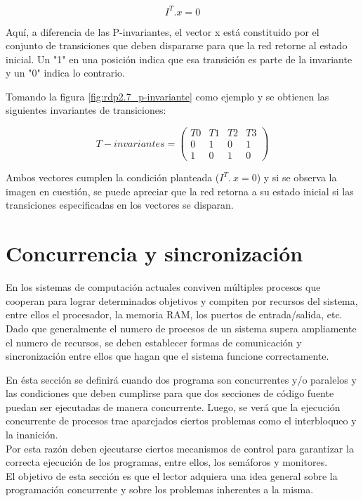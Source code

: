 \begin{equation}
    I^T . x = 0
\end{equation}

Aquí, a diferencia de las P-invariantes, el vector x está constituido por el conjunto de transiciones que deben dispararse para que la red retorne al estado inicial. Un "1" en una posición indica que esa transición es parte de la invariante y un "0" indica lo contrario.

Tomando la figura \ref{fig:rdp2.7_p-invariante} como ejemplo y se obtienen las siguientes invariantes de transiciones:

\begin{equation}
    T-invariantes = 
    \begin{pmatrix}
         T0 & T1 & T2 & T3  \\
         0 & 1 & 0 & 1  \\
         1 & 0 & 1 & 0  
    \end{pmatrix}
\end{equation}

Ambos vectores cumplen la condición planteada ($I^T .\ x = 0$) y si se observa la imagen en cuestión, se puede apreciar que la red retorna a su estado inicial si las transiciones especificadas en los vectores se disparan.


\section{Concurrencia y sincronización} \label{sec:monitor}
En los sistemas de computación actuales conviven múltiples procesos que cooperan para lograr determinados objetivos y compiten por recursos del sistema, entre ellos el procesador, la memoria RAM, los puertos de entrada/salida, etc.\\
Dado que generalmente el numero de procesos de un sistema supera ampliamente el numero de recursos, se deben establecer formas de comunicación y sincronización entre ellos que hagan que el sistema funcione correctamente. 

\par En ésta sección se definirá cuando dos programa son concurrentes y/o paralelos y las condiciones que deben cumplirse para que dos secciones de código fuente puedan ser ejecutadas de manera concurrente. Luego, se verá que la ejecución concurrente de procesos trae aparejados ciertos problemas como el interbloqueo y la inanición.\\
Por esta razón deben ejecutarse ciertos mecanismos de control para garantizar la correcta ejecución de los programas, entre ellos, los semáforos y monitores.\\
El objetivo de esta sección es que el lector adquiera una idea general sobre la programación concurrente y sobre los problemas inherentes a la misma.


